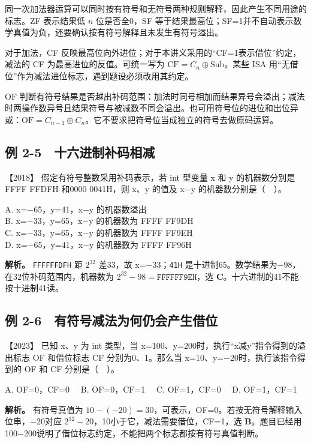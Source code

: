同一次加法器运算可以同时按有符号和无符号两种规则解释，因此产生不同用途的标志。ZF 表示结果低 \(n\) 位是否全0，SF 等于结果最高位；SF=1并不自动表示数学真值为负，还要确认按有符号解释且未发生有符号溢出。

对于加法，CF 反映最高位向外进位；对于本讲义采用的``CF=1表示借位''约定，减法的 CF 为最高进位的反值。可统一写为 \(\mathrm{CF}=C_n\oplus\mathrm{Sub}\)。某些 ISA 用``无借位''作为减法进位标志，遇到题设必须改用其约定。

OF 判断有符号结果是否越出补码范围：加法时同号相加而结果异号会溢出；减法时两操作数异号且结果符号与被减数不同会溢出。也可用符号位的进位和出位异或：\(\mathrm{OF}=C_{n-1}\oplus C_n\)。它不要求把符号位当成独立的符号去做原码运算。

\subsection{例 2-5　十六进制补码相减}\label{co-ex2-5}

\noindent{}【2018】 假定有符号整数采用补码表示，若 int 型变量 x 和 y 的机器数分别是 FFFF FFDFH 和0000 0041H，则 x、y 的值及 x−y 的机器数分别是（　）。

A. x=−65，y=41，x−y 的机器数溢出\\
B. x=−33，y=65，x−y 的机器数为 FFFF FF9DH\\
C. x=−33，y=65，x−y 的机器数为 FFFF FF9EH\\
D. x=−65，y=41，x−y 的机器数为 FFFF FF96H


\textbf{解析。} \allowbreak{}\texttt{FFFFFFDFH} 距 \(2^{32}\) 差33，故 x=−33；\allowbreak{}\texttt{41H} 是十进制65。数学结果为−98，在32位补码范围内，机器数为 \(2^{32}-98=\mathtt{FFFFFF9EH}\)，选 \textbf{C}。十六进制的41不能按十进制41读。

\subsection{例 2-6　有符号减法为何仍会产生借位}\label{co-ex2-6}

\noindent{}【2023】 已知 x、y 为 int 类型，当 x=100、y=200时，执行``x减y''指令得到的溢出标志 OF 和借位标志 CF 分别为0、1。那么当 x=10、y=−20时，执行该指令得到的 OF 和 CF 分别是（　）。

A. OF=0，CF=0　 B. OF=0，CF=1　 C. OF=1，CF=0　 D. OF=1，CF=1


\textbf{解析。} 有符号真值为 \(10-(-20)=30\)，可表示，OF=0。若按无符号解释输入位串，−20对应 \(2^{32}-20\)，10小于它，减法需要借位，CF=1，选 \textbf{B}。题目已经用100−200说明了借位标志约定，不能把两个标志都按有符号真值判断。

